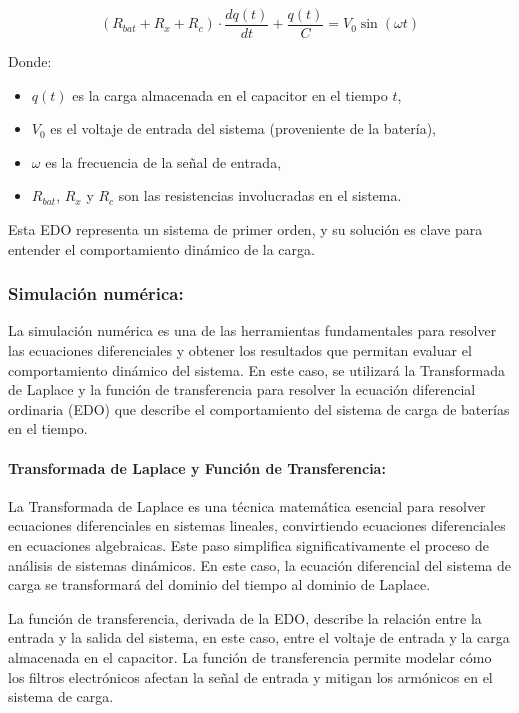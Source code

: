 \[
	(R_{bat} + R_x + R_c) \cdot \frac{dq(t)}{dt} + \frac{q(t)}{C} = V_0 \sin(\omega t)
\]

Donde:
\begin{itemize}
	\item \(q(t)\) es la carga almacenada en el capacitor en el tiempo \(t\),
	\item \(V_0\) es el voltaje de entrada del sistema (proveniente de la batería),
	\item \(\omega\) es la frecuencia de la señal de entrada,
	\item \(R_{bat}\), \(R_x\) y \(R_c\) son las resistencias involucradas en el sistema.
\end{itemize}

Esta EDO representa un sistema de primer orden, y su solución es clave para entender el
comportamiento dinámico de la carga.

\subsubsection*{Simulación numérica:}
La simulación numérica es una de las herramientas fundamentales para resolver las
ecuaciones diferenciales y obtener los resultados que permitan evaluar el comportamiento
dinámico del sistema. En este caso, se utilizará la Transformada de Laplace y la función de
transferencia para resolver la ecuación diferencial ordinaria (EDO) que describe el
comportamiento del sistema de carga de baterías en el tiempo.

\paragraph*{Transformada de Laplace y Función de Transferencia:}
La Transformada de Laplace es una técnica matemática esencial para resolver
ecuaciones diferenciales en sistemas lineales, convirtiendo ecuaciones diferenciales
en ecuaciones algebraicas. Este paso simplifica significativamente el proceso de
análisis de sistemas dinámicos. En este caso, la ecuación diferencial del sistema de
carga se transformará del dominio del tiempo al dominio de Laplace.

La función de transferencia, derivada de la EDO, describe la relación entre la entrada
y la salida del sistema, en este caso, entre el voltaje de entrada y la carga almacenada
en el capacitor. La función de transferencia permite modelar cómo los filtros
electrónicos afectan la señal de entrada y mitigan los armónicos en el sistema de
carga.

